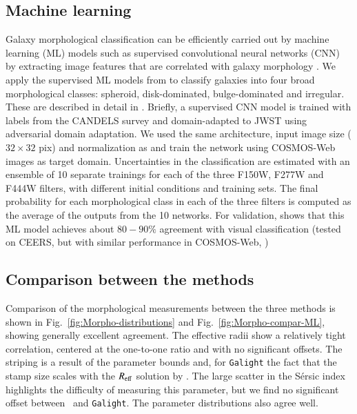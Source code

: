 \documentclass[longauth]{aa}
\begin{document}
\subsection{Machine learning}
Galaxy morphological classification can be efficiently carried out by machine learning (ML) models such as supervised convolutional neural networks (CNN) by extracting image features that are correlated with galaxy morphology \citep[][for a review]{MHC-Lanusse2023}. We apply the supervised ML models from \cite{MHC2024} to classify galaxies into four broad morphological classes: spheroid, disk-dominated, bulge-dominated and irregular. These are described in detail in \cite{MHC2025}. Briefly, a supervised CNN model is trained with labels from the CANDELS survey and domain-adapted to JWST using adversarial domain adaptation. We used the same architecture, input image size ($32\times32$ pix) and normalization as \cite{MHC2024} and train the network using COSMOS-Web images as target domain. Uncertainties in the classification are estimated with an ensemble of 10 separate trainings for each of the three F150W, F277W and F444W filters, with different initial conditions and training sets. The final probability for each morphological class in each of the three filters is computed as the average of the outputs from the 10 networks. For validation, \cite{MHC2024} shows that this ML model achieves about $80-90 \%$ agreement with visual classification (tested on CEERS, but with similar performance in COSMOS-Web, \citealt{MHC2025})




\subsection{Comparison between the methods}

Comparison of the morphological measurements between the three methods is shown in Fig.~\ref{fig:Morpho-distributions} and Fig.~\ref{fig:Morpho-compar-ML}, showing generally excellent agreement. The effective radii show a relatively tight correlation, centered at the one-to-one ratio and with no significant offsets. The striping is a result of the parameter bounds and, for \texttt{Galight} the fact that the stamp size scales with the $R_{\rm eff}$ solution by \SEpp. The large scatter in the S\'ersic index highlights the difficulty of measuring this parameter, but we find no significant offset between \SEpp\ and \texttt{Galight}. The parameter distributions also agree well. 
\end{document}
